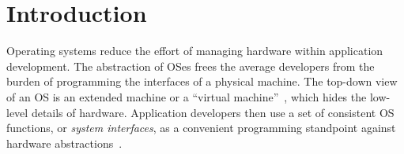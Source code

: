 \chapter{Introduction}
\label{chap:intro}


Operating systems reduce the effort of managing hardware within application development.
The abstraction of OSes frees the average developers from
the burden of programming the interfaces of a physical machine.
The top-down view of an OS is an extended machine or a ``virtual machine''~\cite{tanenbaum19os-textbook,dhamdhere2007os-textbook},
which hides the low-level details of hardware.
Application developers then use a set of consistent OS functions, 
or
{\em system interfaces},
as a convenient programming standpoint against hardware abstractions~\cite{ritchie74unix}. 
